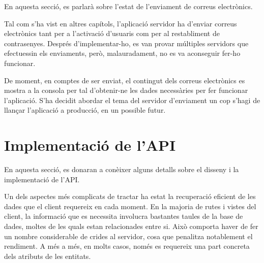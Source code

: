 \documentclass[a4paper,12pt]{ThesisStyle}
\begin{document}
En aquesta secció, es parlarà sobre l'estat de l'enviament de correus electrònics.

Tal com s'ha vist en altres capítols, l'aplicació servidor ha d'enviar correus electrònics tant per a l'activació d'usuaris com per al restabliment de contrasenyes. Després d'implementar-ho, es van provar múltiples servidors que efectuessin els enviaments, però, malauradament, no es va aconseguir fer-ho funcionar.

De moment, en comptes de ser enviat, el contingut dels correus electrònics es mostra a la consola per tal d'obtenir-ne les dades necessàries per fer funcionar l'aplicació. S'ha decidit abordar el tema del servidor d'enviament un cop s'hagi de llançar l'aplicació a producció, en un possible futur.

\section{Implementació de l'API}
\label{sec:api}

En aquesta secció, es donaran a conèixer alguns detalls sobre el disseny i la implementació de l'API.

Un dels aspectes més complicats de tractar ha estat la recuperació eficient de les dades que el client requereix en cada moment. En la majoria de rutes i vistes del client, la informació que es necessita involucra bastantes taules de la base de dades, moltes de les quals estan relacionades entre si. Això comporta haver de fer un nombre considerable de crides al servidor, cosa que penalitza notablement el rendiment. A més a més, en molts casos, només es requereix una part concreta dels atributs de les entitats. 
\end{document}
